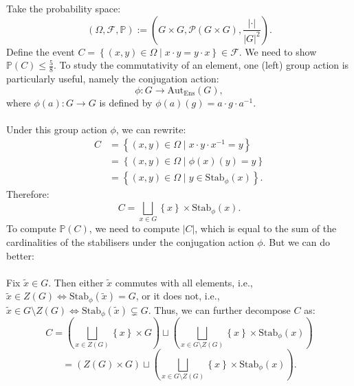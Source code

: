 \begin{solution}
    Take the probability space:
    \[
        \left(\Omega,\mathcal{F},\mathbb{P}\right) := \left(G\times G,\mathscr{P}\left(G\times G\right),\frac{|\cdot|}{|G|^2}\right).
    \]
    Define the event \( C = \left\{ \left(x,y\right)\in\Omega \mid x\cdot y = y\cdot x \right\} \in \mathcal{F} \). We need to show \( \mathbb{P}\left(C\right)\leq \frac{5}{8} \). To study the commutativity of an element, one (left) group action is particularly useful, namely the conjugation action:
    \[
        \phi : G \longrightarrow \mathrm{Aut}_{\mathrm{Ens}}\left(G\right),
    \]
    where \( \phi\left(a\right) : G \longrightarrow G \) is defined by \( \phi\left(a\right)\left(g\right) = a \cdot g \cdot a^{-1} \).
    \\\\
    Under this group action \( \phi \), we can rewrite:
    \begin{align*}
        C &= \left\{ \left( x, y \right) \in \Omega \mid x \cdot y \cdot x^{-1} = y \right\} \nonumber \\
        &= \left\{ \left( x, y \right) \in \Omega \mid \phi(x)(y) = y \right\} \nonumber \\
        &= \left\{ \left( x, y \right) \in \Omega \mid y \in \mathrm{Stab}_{\phi}(x) \right\}.
    \end{align*}
    Therefore:
    \[
        C = \bigsqcup_{x\in G} \left\{ x \right\} \times \mathrm{Stab}_{\phi}\left(x\right).
    \]
    To compute \( \mathbb{P}\left(C\right) \), we need to compute \( |C| \), which is equal to the sum of the cardinalities of the stabilisers under the conjugation action \( \phi \). But we can do better:
    \\\\
    Fix \( \tilde{x}\in G \). Then either \( \tilde{x} \) commutes with all elements, i.e., \( \tilde{x}\in Z\left(G\right) \Leftrightarrow \mathrm{Stab}_{\phi}\left(\tilde{x}\right) = G \), or it does not, i.e., \( \tilde{x}\in G \setminus Z\left(G\right) \Leftrightarrow \mathrm{Stab}_{\phi}\left(\tilde{x}\right) \subsetneq G \). Thus, we can further decompose \( C \) as:
    \[
        C = \left( \bigsqcup_{x\in Z\left(G\right)} \left\{ x \right\} \times G \right) \sqcup \left( \bigsqcup_{x\in G \setminus Z\left(G\right)} \left\{ x \right\} \times \mathrm{Stab}_{\phi}\left(x\right) \right)
    \]
    \[
        = \left(Z\left(G\right)\times G\right) \sqcup \left( \bigsqcup_{x\in G \setminus Z\left(G\right)} \left\{ x \right\} \times \mathrm{Stab}_{\phi}\left(x\right) \right).
\]
\end{solution}
